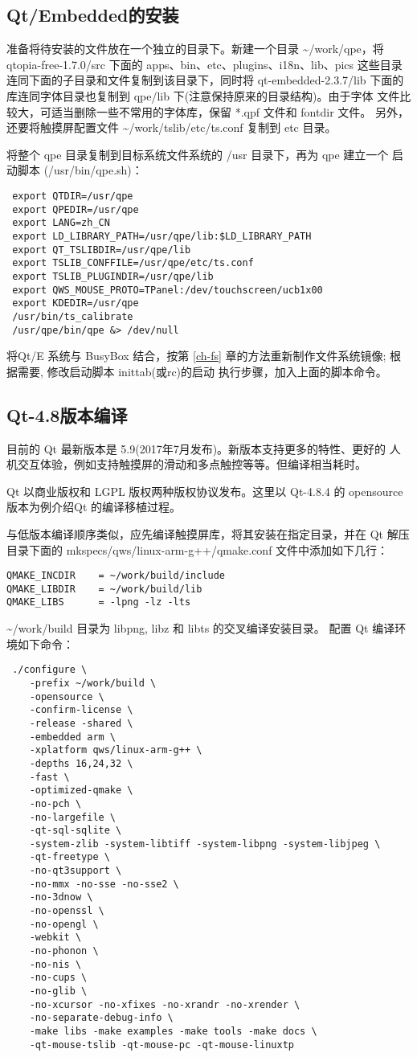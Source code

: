 \subsection{Qt/Embedded的安装}
准备将待安装的文件放在一个独立的目录下。新建一个目录
\textasciitilde/work/qpe，将
qtopia-free-1.7.0/src 下面的 apps、bin、etc、plugins、i18n、lib、pics
这些目录连同下面的子目录和文件复制到该目录下，同时将 qt-embedded-2.3.7/lib
下面的库连同字体目录也复制到 qpe/lib 下(注意保持原来的目录结构)。由于字体
文件比较大，可适当删除一些不常用的字体库，保留 *.qpf 文件和 fontdir 文件。
另外，还要将触摸屏配置文件 \textasciitilde/work/tslib/etc/ts.conf
复制到 etc 目录。

将整个 qpe 目录复制到目标系统文件系统的 /usr 目录下，再为 qpe 建立一个
启动脚本 (/usr/bin/qpe.sh)：
\begin{verbatim} 
 export QTDIR=/usr/qpe
 export QPEDIR=/usr/qpe
 export LANG=zh_CN
 export LD_LIBRARY_PATH=/usr/qpe/lib:$LD_LIBRARY_PATH
 export QT_TSLIBDIR=/usr/qpe/lib
 export TSLIB_CONFFILE=/usr/qpe/etc/ts.conf
 export TSLIB_PLUGINDIR=/usr/qpe/lib
 export QWS_MOUSE_PROTO=TPanel:/dev/touchscreen/ucb1x00
 export KDEDIR=/usr/qpe
 /usr/bin/ts_calibrate
 /usr/qpe/bin/qpe &> /dev/null
\end{verbatim}

将Qt/E 系统与 BusyBox 结合，按第 \ref{ch-fs}
章的方法重新制作文件系统镜像; 根据需要, 修改启动脚本 inittab(或rc)的启动
执行步骤，加入上面的脚本命令。

\subsection{Qt-4.8版本编译}
目前的 Qt 最新版本是 5.9(2017年7月发布)。新版本支持更多的特性、更好的
人机交互体验，例如支持触摸屏的滑动和多点触控等等。但编译相当耗时。

Qt 以商业版权和 LGPL 版权两种版权协议发布。这里以 Qt-4.8.4 的 opensource
版本为例介绍Qt 的编译移植过程。

与低版本编译顺序类似，应先编译触摸屏库，将其安装在指定目录，并在 Qt
解压目录下面的 mkspecs/qws/linux-arm-g++/qmake.conf 文件中添加如下几行：
\begin{verbatim}
QMAKE_INCDIR    = ~/work/build/include
QMAKE_LIBDIR    = ~/work/build/lib
QMAKE_LIBS      = -lpng -lz -lts
\end{verbatim}

\textasciitilde/work/build 目录为 libpng, libz 和 libts 的交叉编译安装目录。
配置 Qt 编译环境如下命令：
\begin{verbatim}
 ./configure \
    -prefix ~/work/build \
    -opensource \
    -confirm-license \
    -release -shared \
    -embedded arm \
    -xplatform qws/linux-arm-g++ \
    -depths 16,24,32 \
    -fast \
    -optimized-qmake \
    -no-pch \
    -no-largefile \
    -qt-sql-sqlite \
    -system-zlib -system-libtiff -system-libpng -system-libjpeg \
    -qt-freetype \
    -no-qt3support \
    -no-mmx -no-sse -no-sse2 \
    -no-3dnow \
    -no-openssl \
    -no-opengl \
    -webkit \
    -no-phonon \
    -no-nis \
    -no-cups \
    -no-glib \
    -no-xcursor -no-xfixes -no-xrandr -no-xrender \
    -no-separate-debug-info \
    -make libs -make examples -make tools -make docs \
    -qt-mouse-tslib -qt-mouse-pc -qt-mouse-linuxtp
\end{verbatim}

